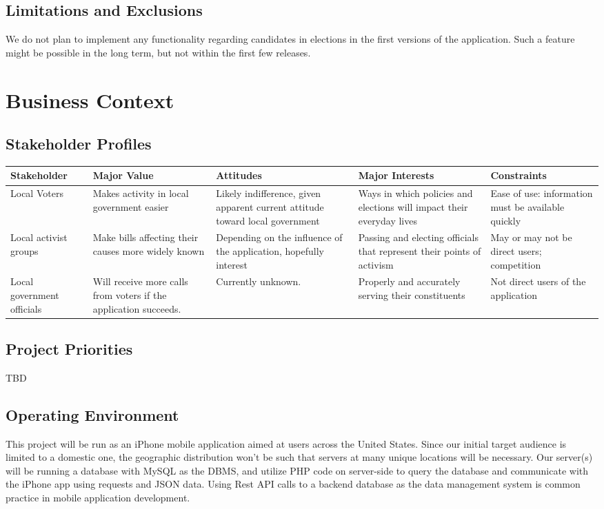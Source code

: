 \subsection{Limitations and Exclusions}
We do not plan to implement any functionality regarding candidates in
elections in the first versions of the application. Such a feature
might be possible in the long term, but not within the first few
releases.


\section{Business Context}
\subsection{Stakeholder Profiles}
\begin{adjustbox}{center,minipage=[c]{\paperwidth - 1in}}
  \begin{tabu}{lX[L]X[L]X[L]X[L]}
    \toprule
    Stakeholder & Major Value & Attitudes & Major Interests & Constraints\\
    \midrule
    Local Voters&
    Makes activity in local government easier&
    Likely indifference, given apparent current attitude toward local government&
    Ways in which policies and elections will impact their everyday lives&
    Ease of use: information must be available quickly\\

    Local activist groups&
    Make bills affecting their causes more widely known&
    Depending on the influence of the application, hopefully interest&
    Passing and electing officials that represent their points of activism&
    May or may not be direct users; competition\\

    Local government officials&
    Will receive more calls from voters if the application succeeds.&
    Currently unknown.&
    Properly and accurately serving their constituents&
    Not direct users of the application\\
    \bottomrule
  \end{tabu}
\end{adjustbox}

\subsection{Project Priorities}
TBD

\subsection{Operating Environment}
This project will be run as an iPhone mobile application aimed at
users across the United States. Since our initial target audience is
limited to a domestic one, the geographic distribution won’t be such
that servers at many unique locations will be necessary. Our server(s)
will be running a database with MySQL as the DBMS, and utilize PHP
code on server-side to query the database and communicate with the
iPhone app using requests and JSON data. Using Rest API calls to a
backend database as the data management system is common practice in
mobile application development.

